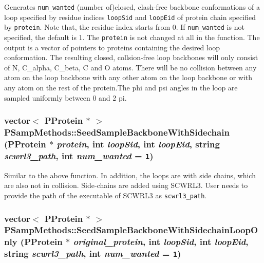Generates {\tt num\_\-wanted} (number of)closed, clash-free backbone conformations of a loop specified by residue indices {\tt loop\-Sid} and {\tt loop\-Eid} of protein chain specified by {\tt protein}. Note that, the residue index starts from 0. If {\tt num\_\-wanted} is not specified, the default is 1. The {\tt protein} is not changed at all in the function. The output is a vector of pointers to proteins containing the desired loop conformation. The resulting closed, collsion-free loop backbones will only consist of N, C\_\-alpha, C\_\-beta, C and O atoms. There will be no collision between any atom on the loop backbone with any other atom on the loop backbone or with any atom on the rest of the protein.The phi and psi angles in the loop are sampled uniformly between 0 and 2 pi. 
\subsubsection{\setlength{\rightskip}{0pt plus 5cm}vector$<$ {\bf PProtein} $\ast$ $>$ PSamp\-Methods::Seed\-Sample\-Backbone\-With\-Sidechain ({\bf PProtein} $\ast$ {\em protein}, int {\em loop\-Sid}, int {\em loop\-Eid}, string {\em scwrl3\_\-path}, int {\em num\_\-wanted} = {\tt 1})\hspace{0.3cm}{\tt  [static]}}\label{classPSampMethods_5f141827dacb75c6b3b2a54806ef7d81}


Similar to the above function. In addition, the loops are with side chains, which are also not in collision. Side-chains are added using SCWRL3. User needs to provide the path of the executable of SCWRL3 as {\tt scwrl3\_\-path}. 
\subsubsection{\setlength{\rightskip}{0pt plus 5cm}vector$<$ {\bf PProtein} $\ast$ $>$ PSamp\-Methods::Seed\-Sample\-Backbone\-With\-Sidechain\-Loop\-Only ({\bf PProtein} $\ast$ {\em original\_\-protein}, int {\em loop\-Sid}, int {\em loop\-Eid}, string {\em scwrl3\_\-path}, int {\em num\_\-wanted} = {\tt 1})\hspace{0.3cm}{\tt  [static]}}\label{classPSampMethods_e073841f484c145d13cbc5fab8f13ee3}


